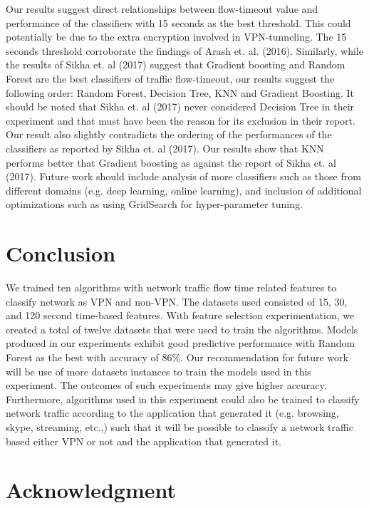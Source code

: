 \documentclass[conference]{IEEEtran}
\begin{document}
Our results suggest direct relationships between flow-timeout value and performance of the classifiers with 15 seconds as the best threshold. This could potentially be due to the extra encryption involved in VPN-tunneling. The 15 seconds threshold corroborate the findings of Arash et. al. (2016). Similarly, while the results of Sikha et. al (2017) suggest that Gradient boosting and Random Forest are the best classifiers of traffic flow-timeout, our results suggest the following order: Random Forest, Decision Tree, KNN and Gradient Boosting. It should be noted that Sikha et. al (2017) never considered Decision Tree in their experiment and that must have been the reason for its exclusion in their report. Our result also slightly contradicts the ordering of the performances of the classifiers as reported by Sikha et. al (2017). Our results show that KNN performs better that Gradient boosting as against the report of Sikha et. al (2017). Future work should include analysis of more classifiers such as those from different domains (e.g. deep learning, online learning), and inclusion of additional optimizations such as using GridSearch for hyper-parameter tuning.


\section{Conclusion}

We trained ten algorithms with network traffic flow time related features to classify network as VPN and non-VPN. The datasets used consisted of 15, 30, and 120 second time-based features. With feature selection experimentation, we created a total of twelve datasets that were used to train the algorithms. Models produced in our experiments exhibit good predictive performance with Random Forest as the best with accuracy of 86\%. Our recommendation for future work will be use of more datasets instances to train the models used in this experiment. The outcomes of such experiments may give higher accuracy. Furthermore, algorithms used in this experiment could also be trained to classify network traffic according to the application that generated it (e.g. browsing, skype, streaming, etc.,) such that it will be possible to classify a network traffic based either VPN or not and the application that generated it.




\section*{Acknowledgment}
\end{document}
